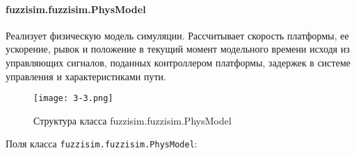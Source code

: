 \paragraph{fuzzisim.fuzzisim.PhysModel}

Реализует физическую модель симуляции. Рассчитывает скорость платформы, ее ускорение, рывок и положение в текущий момент модельного времени исходя из управляющих сигналов, поданных контроллером платформы, задержек в системе управления и характеристиками пути.

\begin{figure}[ht]
    \centering
    \texttt{[image: 3-3.png]}
    \caption{  Структура класса fuzzisim.fuzzisim.PhysModel }
    \label{fig:domain:1:1}
\end{figure}

Поля класса \lstinline!fuzzisim.fuzzisim.PhysModel!:

